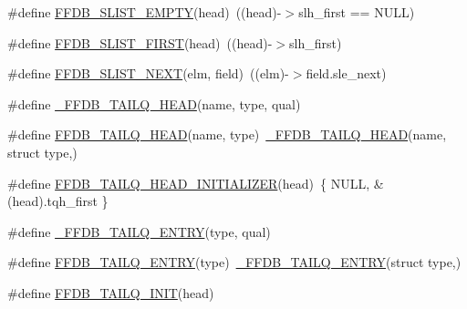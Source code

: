 \begin{DoxyCompactItemize}
\item 
\#define \mbox{\hyperlink{adat-devel_2other__libs_2filedb_2filehash_2ffdb__cq_8h_a31ce28f07c9fade2ae897b5dbeb2a212}{F\+F\+D\+B\+\_\+\+S\+L\+I\+S\+T\+\_\+\+E\+M\+P\+TY}}(head)~((head)-\/$>$slh\+\_\+first == N\+U\+LL)
\item 
\#define \mbox{\hyperlink{adat-devel_2other__libs_2filedb_2filehash_2ffdb__cq_8h_ae564430fafc00c6a8e841a220d582904}{F\+F\+D\+B\+\_\+\+S\+L\+I\+S\+T\+\_\+\+F\+I\+R\+ST}}(head)~((head)-\/$>$slh\+\_\+first)
\item 
\#define \mbox{\hyperlink{adat-devel_2other__libs_2filedb_2filehash_2ffdb__cq_8h_afdfcb40ab4989345e53f228647755aaa}{F\+F\+D\+B\+\_\+\+S\+L\+I\+S\+T\+\_\+\+N\+E\+XT}}(elm,  field)~((elm)-\/$>$field.\+sle\+\_\+next)
\item 
\#define \mbox{\hyperlink{adat-devel_2other__libs_2filedb_2filehash_2ffdb__cq_8h_ac5fd58bff07d9895d33335221e4100fc}{\+\_\+\+F\+F\+D\+B\+\_\+\+T\+A\+I\+L\+Q\+\_\+\+H\+E\+AD}}(name,  type,  qual)
\item 
\#define \mbox{\hyperlink{adat-devel_2other__libs_2filedb_2filehash_2ffdb__cq_8h_ab3ff94c51f5c6a4ca217c7e09b5cb07b}{F\+F\+D\+B\+\_\+\+T\+A\+I\+L\+Q\+\_\+\+H\+E\+AD}}(name,  type)~\mbox{\hyperlink{adat__devel_2other__libs_2filedb_2filehash_2ffdb__cq_8h_ac5fd58bff07d9895d33335221e4100fc}{\+\_\+\+F\+F\+D\+B\+\_\+\+T\+A\+I\+L\+Q\+\_\+\+H\+E\+AD}}(name, struct type,)
\item 
\#define \mbox{\hyperlink{adat-devel_2other__libs_2filedb_2filehash_2ffdb__cq_8h_ae73cb59645522f7c14b9d7c837a8689e}{F\+F\+D\+B\+\_\+\+T\+A\+I\+L\+Q\+\_\+\+H\+E\+A\+D\+\_\+\+I\+N\+I\+T\+I\+A\+L\+I\+Z\+ER}}(head)~\{ N\+U\+LL, \&(head).tqh\+\_\+first \}
\item 
\#define \mbox{\hyperlink{adat-devel_2other__libs_2filedb_2filehash_2ffdb__cq_8h_aad2af737f8a9c9f8bd45313ae2813a24}{\+\_\+\+F\+F\+D\+B\+\_\+\+T\+A\+I\+L\+Q\+\_\+\+E\+N\+T\+RY}}(type,  qual)
\item 
\#define \mbox{\hyperlink{adat-devel_2other__libs_2filedb_2filehash_2ffdb__cq_8h_a7df02f20720d1790ccb6f535c27127cc}{F\+F\+D\+B\+\_\+\+T\+A\+I\+L\+Q\+\_\+\+E\+N\+T\+RY}}(type)~\mbox{\hyperlink{adat__devel_2other__libs_2filedb_2filehash_2ffdb__cq_8h_aad2af737f8a9c9f8bd45313ae2813a24}{\+\_\+\+F\+F\+D\+B\+\_\+\+T\+A\+I\+L\+Q\+\_\+\+E\+N\+T\+RY}}(struct type,)
\item 
\#define \mbox{\hyperlink{adat-devel_2other__libs_2filedb_2filehash_2ffdb__cq_8h_a0f800ea48133c64373d3a9415f2da26d}{F\+F\+D\+B\+\_\+\+T\+A\+I\+L\+Q\+\_\+\+I\+N\+IT}}(head)
\item 

\end{DoxyCompactItemize}
